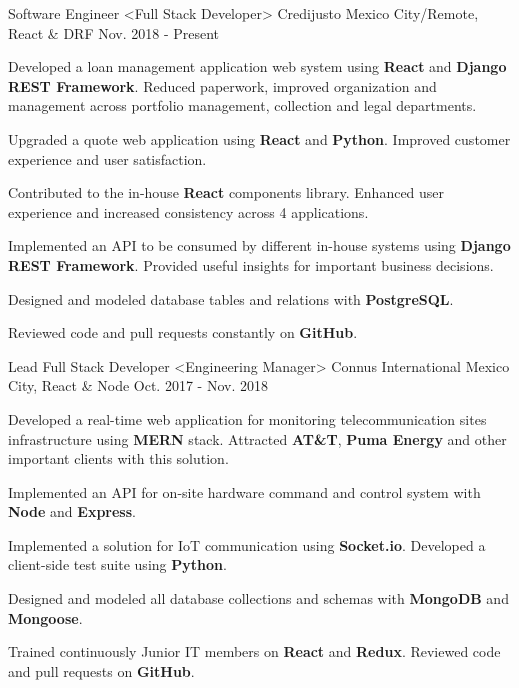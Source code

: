 \begin{cventries}
  \cventry
    {Software Engineer <Full Stack Developer>}
    {Credijusto}
    {Mexico City/Remote, React \& DRF}
    {Nov. 2018 - Present}
    {
      \begin{cvitems}
        \item {Developed a loan management application web system using \textbf{React} and \textbf{Django REST Framework}. Reduced paperwork, improved organization and management across portfolio management, collection and legal departments.}
        \item {Upgraded a quote web application using \textbf{React} and \textbf{Python}. Improved customer experience and user satisfaction.}
        \item {Contributed to the in-house \textbf{React} components library. Enhanced user experience and increased consistency across 4 applications.}
        \item {Implemented an API to be consumed by different in-house systems using \textbf{Django REST Framework}. Provided useful insights for important business decisions.}
        \item {Designed and modeled database tables and relations with \textbf{PostgreSQL}.}
        \item {Reviewed code and pull requests constantly on \textbf{GitHub}.}
      \end{cvitems}
    }
  \cventry
    {Lead Full Stack Developer <Engineering Manager>}
    {Connus International}
    {Mexico City, React \& Node}
    {Oct. 2017 - Nov. 2018}
    {
      \begin{cvitems}
        \item {Developed a real-time web application for monitoring telecommunication sites infrastructure using \textbf{MERN} stack. Attracted \textbf{AT\&T}, \textbf{Puma Energy} and other important clients with this solution.}
        \item {Implemented an API for on-site hardware command and control system with \textbf{Node} and \textbf{Express}.}
        \item {Implemented a solution for IoT communication using \textbf{Socket.io}. Developed a client-side test suite using \textbf{Python}.}
        \item {Designed and modeled all database collections and schemas with \textbf{MongoDB} and \textbf{Mongoose}.}
        \item {Trained continuously Junior IT members on \textbf{React} and \textbf{Redux}. Reviewed code and pull requests on \textbf{GitHub}.}

\end{cvitems}}
\end{cventries}
